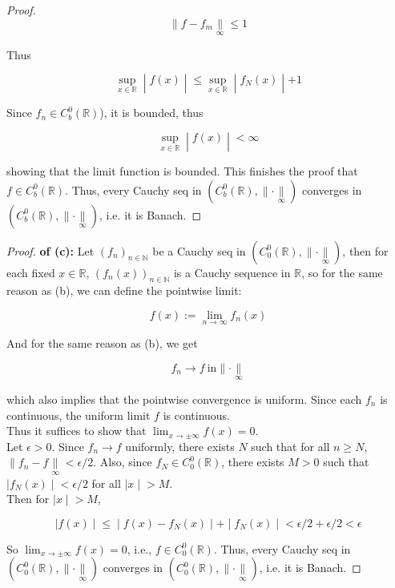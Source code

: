 \documentclass{qlnotes-export}
\begin{document}
\begin{proof}
\[\parallel f - f_{m}\underset{\infty}{\parallel} \leq 1\]

Thus

\[\left. \sup\limits_{x \in {\mathbb{R}}} \middle| f(x) \middle| \leq \sup\limits_{x \in {\mathbb{R}}} \middle| f_{N}(x) \middle| + 1 \right.\]

Since \(f_{n} \in C_{b}^{0}({\mathbb{R}})\)), it is bounded, thus

\[\left. \sup\limits_{x \in {\mathbb{R}}} \middle| f(x) \middle| < \infty \right.\]

showing that the limit function is bounded. This finishes the proof that \(f \in C_{b}^{0}({\mathbb{R}})\). Thus, every Cauchy seq in \((C_{b}^{0}({\mathbb{R}}), \parallel \cdot \underset{\infty}{\parallel})\) converges in \((C_{b}^{0}({\mathbb{R}}), \parallel \cdot \underset{\infty}{\parallel})\), i.e. it is Banach.

\end{proof}

\begin{proof}

\textbf{of (c):} Let \((f_{n})_{n \in {\mathbb{N}}}\) be a Cauchy seq in \((C_{0}^{0}({\mathbb{R}}), \parallel \cdot \underset{\infty}{\parallel})\), then for each fixed \(x \in {\mathbb{R}}\), \((f_{n}(x))_{n \in {\mathbb{N}}}\) is a Cauchy sequence in \(\mathbb{R}\), so for the same reason as (b), we can define the pointwise limit:

\[f(x) := \lim\limits_{n\rightarrow\infty}f_{n}(x)\]

And for the same reason as (b), we get

\[f_{n}\rightarrow f\ \text{in} \parallel \cdot \underset{\infty}{\parallel}\]

which also implies that the pointwise convergence is uniform. Since each \(f_{n}\) is continuous, the uniform limit \(f\) is continuous.\\
Thus it suffices to show that \(\lim_{x\rightarrow \pm \infty}f(x) = 0\).\\
Let \(\epsilon > 0\). Since \(f_{n}\rightarrow f\) uniformly, there exists \(N\) such that for all \(n \geq N\), \(\parallel f_{n} - f\underset{\infty}{\parallel} < \epsilon/2\). Also, since \(f_{N} \in C_{0}^{0}({\mathbb{R}})\), there exists \(M > 0\) such that \(\left. |f_{N}(x) \middle| < \epsilon/2 \right.\) for all \(\left. |x \middle| > M \right.\).\\
Then for \(\left. |x \middle| > M \right.\),

\[\left. |f(x) \middle| \leq \middle| f(x) - f_{N}(x) \middle| + \middle| f_{N}(x) \middle| < \epsilon/2 + \epsilon/2 < \epsilon \right.\]

So \(\lim_{x\rightarrow \pm \infty}f(x) = 0\), i.e., \(f \in C_{0}^{0}({\mathbb{R}})\). Thus, every Cauchy seq in \((C_{0}^{0}({\mathbb{R}}), \parallel \cdot \underset{\infty}{\parallel})\) converges in \((C_{0}^{0}({\mathbb{R}}), \parallel \cdot \underset{\infty}{\parallel})\), i.e. it is Banach.

\end{proof}
\end{document}

